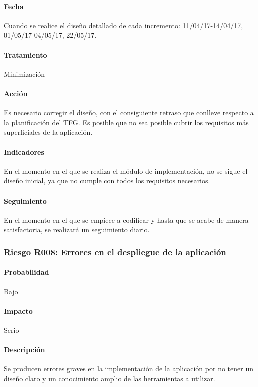 \documentclass[10pt,a4paper]{article}
\begin{document}
				\paragraph{Fecha} Cuando se realice el diseño detallado de cada incremento: 11/04/17-14/04/17, 01/05/17-04/05/17, 22/05/17.%
				\paragraph{Tratamiento} Minimización  %
				\paragraph{Acción} Es necesario corregir el diseño, con el consiguiente retraso que conlleve respecto a la planificación del TFG. Es posible que no sea posible cubrir los requisitos más superficiales de la aplicación.%
				\paragraph{Indicadores} En el momento en el que se realiza el módulo de implementación, no se sigue el diseño inicial, ya que no cumple con todos los requisitos necesarios. %
				\paragraph{Seguimiento}	En el momento en el que se empiece a codificar y hasta que se acabe de manera satisfactoria, se realizará un seguimiento diario. %
			
			\subsubsection{Riesgo R008: Errores en el despliegue de la aplicación}
				\paragraph{Probabilidad} Bajo
				\paragraph{Impacto}	Serio
				\paragraph{Descripción} Se producen errores graves en la implementación de la aplicación por no tener un diseño claro y un conocimiento amplio de las herramientas a utilizar.
\end{document}

